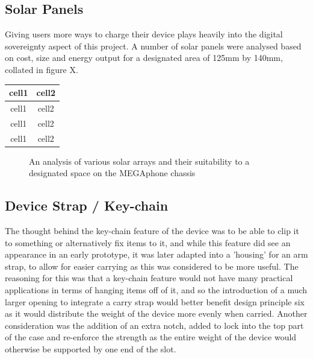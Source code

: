 
\subsection{Solar Panels}

Giving users more ways to charge their device plays heavily into the digital sovereignty aspect of this project.
A number of solar panels were analysed based on cost, size and energy output for a designated area of 125mm by 140mm, collated in figure X.

\begin{center}
    \begin{tabular}{ |c|c| } 
    \hline
    cell1 & cell2 \\
    \hline
    cell1 & cell2 \\ 
    \hline
    cell1 & cell2 \\ 
    \hline
    cell1 & cell2 \\
    \hline
    \end{tabular}
\end{center}

\begin{figure}
    \caption{An analysis of various solar arrays and their suitability to a designated space on the MEGAphone chassis}
    \label{fig:DesignPrinciples}
\end{figure}

\subsection{Device Strap / Key-chain}

The thought behind the key-chain feature of the device was to be able to clip it to something or alternatively fix items to it, and while this feature did see an appearance in an early prototype, it was later adapted into a 'housing' for an arm strap, to allow for easier carrying as this was considered to be more useful.
The reasoning for this was that a key-chain feature would not have many practical applications in terms of hanging items off of it, and so the introduction of a much larger opening to integrate a carry strap would better benefit design principle six as it would distribute the weight of the device more evenly when carried.
Another consideration was the addition of an extra notch, added to lock into the top part of the case and re-enforce the strength as the entire weight of the device would otherwise be supported by one end of the slot. %

